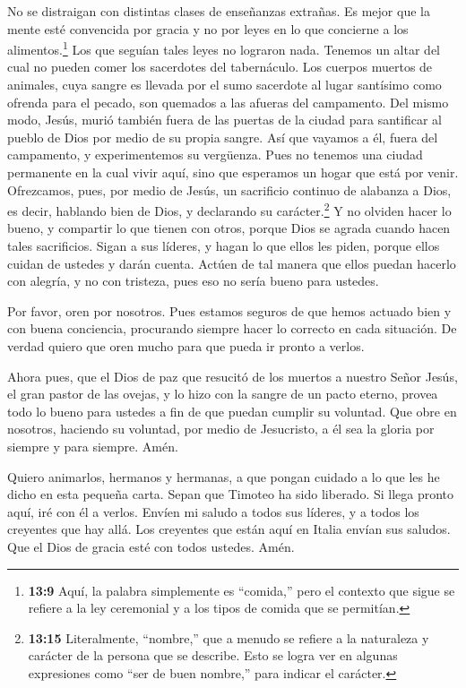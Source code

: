  No se distraigan con distintas clases de enseñanzas
extrañas. Es mejor que la mente esté convencida por gracia y no por
leyes en lo que concierne a los alimentos.\footnote{\textbf{13:9} Aquí,
  la palabra simplemente es ``comida,'' pero el contexto que sigue se
  refiere a la ley ceremonial y a los tipos de comida que se permitían.}
Los que seguían tales leyes no lograron nada.  Tenemos un
altar del cual no pueden comer los sacerdotes del tabernáculo.
 Los cuerpos muertos de animales, cuya sangre es llevada
por el sumo sacerdote al lugar santísimo como ofrenda para el pecado,
son quemados a las afueras del campamento.  Del mismo modo,
Jesús, murió también fuera de las puertas de la ciudad para santificar
al pueblo de Dios por medio de su propia sangre.  Así que
vayamos a él, fuera del campamento, y experimentemos su vergüenza.
 Pues no tenemos una ciudad permanente en la cual vivir
aquí, sino que esperamos un hogar que está por venir. 
Ofrezcamos, pues, por medio de Jesús, un sacrificio continuo de alabanza
a Dios, es decir, hablando bien de Dios, y declarando su
carácter.\footnote{\textbf{13:15} Literalmente, ``nombre,'' que a menudo
  se refiere a la naturaleza y carácter de la persona que se describe.
  Esto se logra ver en algunas expresiones como ``ser de buen nombre,''
  para indicar el carácter.}  Y no olviden hacer lo bueno,
y compartir lo que tienen con otros, porque Dios se agrada cuando hacen
tales sacrificios.  Sigan a sus líderes, y hagan lo que
ellos les piden, porque ellos cuidan de ustedes y darán cuenta. Actúen
de tal manera que ellos puedan hacerlo con alegría, y no con tristeza,
pues eso no sería bueno para ustedes.

 Por favor, oren por nosotros. Pues estamos seguros de que
hemos actuado bien y con buena conciencia, procurando siempre hacer lo
correcto en cada situación.  De verdad quiero que oren
mucho para que pueda ir pronto a verlos.

 Ahora pues, que el Dios de paz que resucitó de los muertos
a nuestro Señor Jesús, el gran pastor de las ovejas, y lo hizo con la
sangre de un pacto eterno,  provea todo lo bueno para
ustedes a fin de que puedan cumplir su voluntad. Que obre en nosotros,
haciendo su voluntad, por medio de Jesucristo, a él sea la gloria por
siempre y para siempre. Amén.

 Quiero animarlos, hermanos y hermanas, a que pongan
cuidado a lo que les he dicho en esta pequeña carta.  Sepan
que Timoteo ha sido liberado. Si llega pronto aquí, iré con él a verlos.
 Envíen mi saludo a todos sus líderes, y a todos los
creyentes que hay allá. Los creyentes que están aquí en Italia envían
sus saludos.  Que el Dios de gracia esté con todos ustedes.
Amén.
